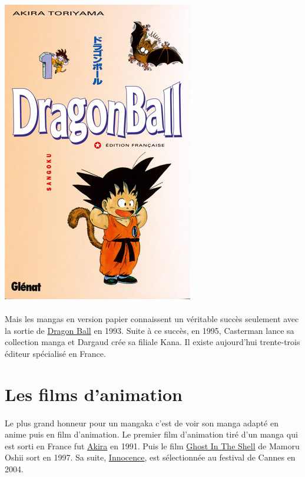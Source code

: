 \begin{center}
	\includegraphics[scale=0.3]{dragonball.jpg}
\end{center}

\paragraph{} Mais les mangas en version papier connaissent un véritable succès
seulement avec la sortie de \underline{Dragon Ball} en 1993. Suite à ce succès,
en 1995, Casterman lance sa collection manga et Dargaud crée sa filiale Kana.
Il existe 	aujourd’hui trente-trois éditeur spécialisé en France.

\section{Les films d'animation}

\paragraph{} Le plus grand honneur pour un mangaka c’est de voir son manga
adapté en anime puis en film d’animation. Le premier film d’animation tiré d’un
manga qui est sorti en France fut \underline{Akira} en 1991. Puis le film
\underline{Ghost In The Shell} de Mamoru Oshii sort en 1997. Sa suite,
\underline{Innocence}, est sélectionnée au festival de Cannes en 2004.


